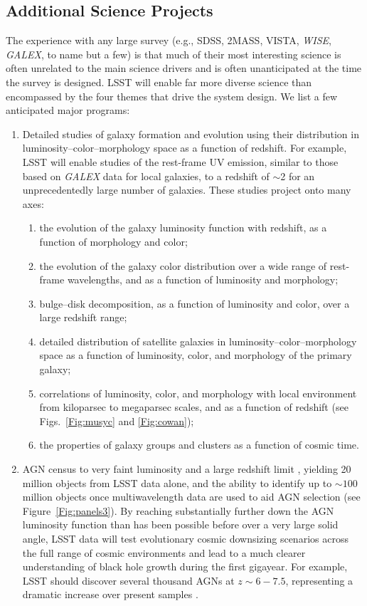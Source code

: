 \subsection{Additional Science Projects}

The experience with any large survey (e.g., SDSS, 2MASS, VISTA, \textit{WISE}, \textit{GALEX}, to name but a
few) is that much of their most interesting science is often unrelated to
the main science drivers and is often unanticipated at the time the survey is
designed. LSST will enable far more diverse science than encompassed by the
four themes that drive the system design. We list a few anticipated major
programs:

\begin{enumerate}
\item Detailed studies of galaxy formation and evolution using their distribution in
luminosity--color--morphology space as a function of redshift. For example, LSST will
enable studies of the rest-frame UV emission, similar to those based on \textit{GALEX} data
for local galaxies, to a redshift of $\sim$2 for an unprecedentedly large number of
galaxies. These studies project onto many axes:
\begin{enumerate}
  \item the evolution of the galaxy luminosity function with redshift, as a function of
        morphology and color;
  \item the evolution of the galaxy color distribution over a wide range of rest-frame
        wavelengths, and as a function of luminosity and morphology;
  \item bulge--disk decomposition, as a function of luminosity and color, over
        a large redshift range;
  \item detailed distribution of satellite galaxies in luminosity--color--morphology space
        as a function of luminosity, color, and morphology of the primary galaxy;
  \item correlations of luminosity, color, and morphology with local environment from
           kiloparsec to megaparsec scales, and as a function of redshift (see  Figs.~\ref{Fig:musyc} and \ref{Fig:cowan});
  \item the properties of galaxy groups and clusters as a function of cosmic time.
\end{enumerate}

\item AGN census to very faint luminosity and a large redshift limit
  \citep{2014IAUS..304...11I}, yielding 20 million objects from LSST
  data alone, and the ability to identify up to $\sim 100$ million objects once multiwavelength
      data are used to aid AGN selection (see Figure~\ref{Fig:panels3}). By reaching substantially further
      down the AGN luminosity function than has been possible before over a very large solid angle, LSST data
      will test evolutionary cosmic downsizing scenarios across the full range of cosmic environments
      and lead to a much clearer understanding of black hole growth during the first gigayear. For
      example, LSST should discover several thousand AGNs at $z\sim6-7.5$,
      representing a dramatic increase over present samples
      \citep[][see also SciBook Chap.~10]{2007AAS...21113709B}.


\end{enumerate}
